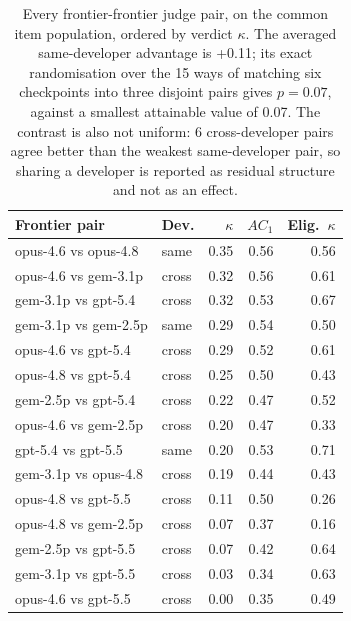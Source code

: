 \begin{table}[t]
\centering\scriptsize
\setlength{\tabcolsep}{4pt}
\begin{tabular}{@{}llrrr@{}}
\toprule
Frontier pair & Dev. & $\kappa$ & $AC_1$ & Elig.\ $\kappa$ \\
\midrule
opus-4.6 vs opus-4.8 & same & 0.35 & 0.56 & 0.56 \\
opus-4.6 vs gem-3.1p & cross & 0.32 & 0.56 & 0.61 \\
gem-3.1p vs gpt-5.4 & cross & 0.32 & 0.53 & 0.67 \\
gem-3.1p vs gem-2.5p & same & 0.29 & 0.54 & 0.50 \\
opus-4.6 vs gpt-5.4 & cross & 0.29 & 0.52 & 0.61 \\
opus-4.8 vs gpt-5.4 & cross & 0.25 & 0.50 & 0.43 \\
gem-2.5p vs gpt-5.4 & cross & 0.22 & 0.47 & 0.52 \\
opus-4.6 vs gem-2.5p & cross & 0.20 & 0.47 & 0.33 \\
gpt-5.4 vs gpt-5.5 & same & 0.20 & 0.53 & 0.71 \\
gem-3.1p vs opus-4.8 & cross & 0.19 & 0.44 & 0.43 \\
opus-4.8 vs gpt-5.5 & cross & 0.11 & 0.50 & 0.26 \\
opus-4.8 vs gem-2.5p & cross & 0.07 & 0.37 & 0.16 \\
gem-2.5p vs gpt-5.5 & cross & 0.07 & 0.42 & 0.64 \\
gem-3.1p vs gpt-5.5 & cross & 0.03 & 0.34 & 0.63 \\
opus-4.6 vs gpt-5.5 & cross & 0.00 & 0.35 & 0.49 \\
\bottomrule
\end{tabular}
\caption{Every frontier-frontier judge pair, on the common item population, ordered by verdict $\kappa$. The averaged same-developer advantage is +0.11; its exact randomisation over the 15 ways of matching six checkpoints into three disjoint pairs gives $p=0.07$, against a smallest attainable value of 0.07. The contrast is also not uniform: 6 cross-developer pairs agree better than the weakest same-developer pair, so sharing a developer is reported as residual structure and not as an effect.}
\label{tab:frontier-pairs}
\end{table}

